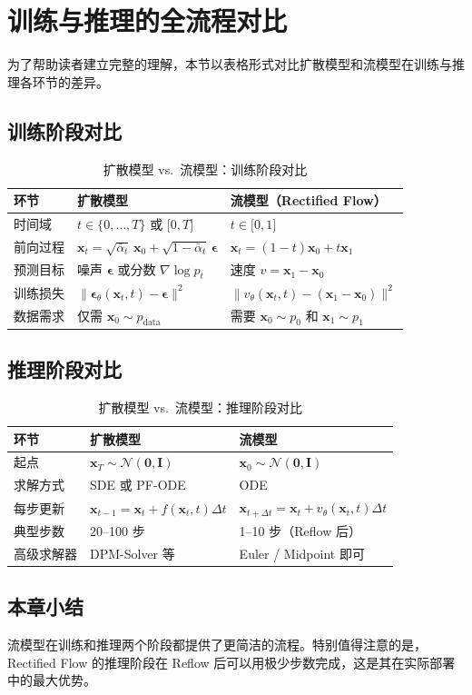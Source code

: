 \section{训练与推理的全流程对比}

为了帮助读者建立完整的理解，本节以表格形式对比扩散模型和流模型在训练与推理各环节的差异。

\subsection{训练阶段对比}

\begin{table}[H]
\centering
\caption{扩散模型 vs.\ 流模型：训练阶段对比}
\begin{tabular}{@{} p{3.8cm} p{5cm} p{5cm} @{}}
\toprule
\textbf{环节} & \textbf{扩散模型} & \textbf{流模型（Rectified Flow）} \\
\midrule
时间域 & $t \in \{0, \ldots, T\}$ 或 ${[}0, T{]}$ & $t \in {[}0, 1{]}$ \\
前向过程 & $\mathbf{x}_t = \sqrt{\bar\alpha_t}\,\mathbf{x}_0 + \sqrt{1-\bar\alpha_t}\,\boldsymbol{\epsilon}$ & $\mathbf{x}_t = (1-t)\mathbf{x}_0 + t\mathbf{x}_1$ \\
预测目标 & 噪声 $\boldsymbol{\epsilon}$ 或分数 $\nabla\log p_t$ & 速度 $v = \mathbf{x}_1 - \mathbf{x}_0$ \\
训练损失 & $\|\boldsymbol{\epsilon}_\theta(\mathbf{x}_t,t) - \boldsymbol{\epsilon}\|^2$ & $\|v_\theta(\mathbf{x}_t,t) - (\mathbf{x}_1-\mathbf{x}_0)\|^2$ \\
数据需求 & 仅需 $\mathbf{x}_0 \sim p_{\text{data}}$ & 需要 $\mathbf{x}_0 \sim p_0$ 和 $\mathbf{x}_1 \sim p_1$ \\
\bottomrule
\end{tabular}
\end{table}

\subsection{推理阶段对比}

\begin{table}[H]
\centering
\caption{扩散模型 vs.\ 流模型：推理阶段对比}
\begin{tabular}{@{} p{3.8cm} p{5cm} p{5cm} @{}}
\toprule
\textbf{环节} & \textbf{扩散模型} & \textbf{流模型} \\
\midrule
起点 & $\mathbf{x}_T \sim \mathcal{N}(\mathbf{0},\mathbf{I})$ & $\mathbf{x}_0 \sim \mathcal{N}(\mathbf{0},\mathbf{I})$ \\
求解方式 & SDE 或 PF-ODE & ODE \\
每步更新 & $\mathbf{x}_{t-1} = \mathbf{x}_t + f(\mathbf{x}_t,t)\Delta t$ & $\mathbf{x}_{t+\Delta t} = \mathbf{x}_t + v_\theta(\mathbf{x}_t,t)\Delta t$ \\
典型步数 & 20--100 步 & 1--10 步（Reflow 后） \\
高级求解器 & DPM-Solver 等 & Euler / Midpoint 即可 \\
\bottomrule
\end{tabular}
\end{table}

\subsection{本章小结}

流模型在训练和推理两个阶段都提供了更简洁的流程。特别值得注意的是，Rectified Flow 的推理阶段在 Reflow 后可以用极少步数完成，这是其在实际部署中的最大优势。


